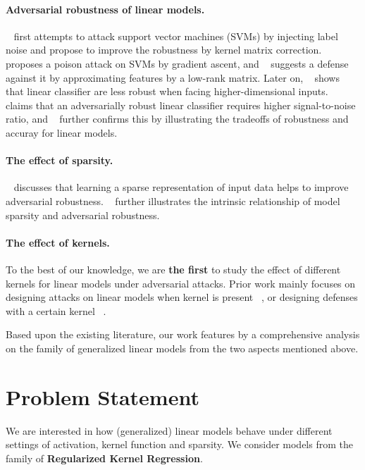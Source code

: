 \documentclass{article}
\begin{document}
\paragraph{Adversarial robustness of linear models.} ~\cite{biggio2011support} first attempts to attack support vector machines (SVMs) by injecting label noise and propose to improve the robustness by kernel matrix correction. ~\cite{bat2012svm} proposes a poison attack on SVMs by gradient ascent, and ~\cite{liu2017robust} suggests a defense against it by approximating features by a low-rank matrix. Later on, ~\cite{megyeri2019adversarial} shows that linear classifier are less robust when facing higher-dimensional inputs. ~\cite{shi2019understanding} claims that an adversarially robust linear classifier requires higher signal-to-noise ratio, and ~\cite{javanmard2020precise} further confirms this by illustrating the tradeoffs of robustness and accuray for linear models.

\paragraph{The effect of sparsity.} ~\cite{gop2018combating} discusses that learning a sparse representation of input data helps to improve adversarial robustness. ~\cite{guo2018sparse} further illustrates the intrinsic relationship of model sparsity and adversarial robustness.

\paragraph{The effect of kernels.} To the best of our knowledge, we are \textbf{the first} to study the effect of different kernels for linear models under adversarial attacks. Prior work mainly focuses on designing attacks on linear models when kernel is present ~\cite{biggio2011support}, or designing defenses with a certain kernel ~\cite{hao2019defending, taghanaki2019kernelized}.

Based upon the existing literature, our work features by a comprehensive analysis on the family of generalized linear models from the two aspects mentioned above.



\section{Problem Statement}
We are interested in how (generalized) linear models behave under different settings of activation, kernel function and sparsity. We consider models from the family of \textbf{Regularized Kernel Regression}.
\end{document}
